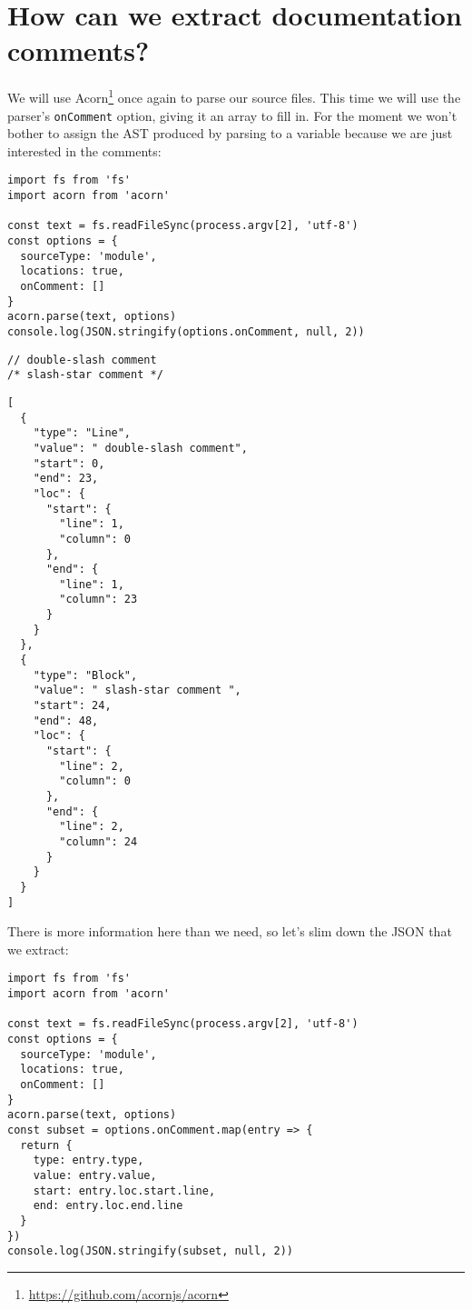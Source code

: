 \documentclass[krantzl]{krantz}
\newcommand{\hreffoot}[2]{{#1}\footnote{\href{#2}{#2}}}
\begin{document}
\section{How can we extract documentation comments?}\label{doc-generator-extract}


We will use \hreffoot{Acorn}{https://github.com/acornjs/acorn} once again to parse our source files.
This time we will use the parser's \texttt{onComment} option,
giving it an array to fill in.
For the moment we won't bother to assign the AST produced by parsing to a variable
because we are just interested in the comments:


\begin{lstlisting}[frame=single,frameround=tttt]
import fs from 'fs'
import acorn from 'acorn'

const text = fs.readFileSync(process.argv[2], 'utf-8')
const options = {
  sourceType: 'module',
  locations: true,
  onComment: []
}
acorn.parse(text, options)
console.log(JSON.stringify(options.onComment, null, 2))
\end{lstlisting}



\begin{lstlisting}[frame=single,frameround=tttt]
// double-slash comment
/* slash-star comment */
\end{lstlisting}



\begin{lstlisting}[frame=single,frameround=tttt]
[
  {
    "type": "Line",
    "value": " double-slash comment",
    "start": 0,
    "end": 23,
    "loc": {
      "start": {
        "line": 1,
        "column": 0
      },
      "end": {
        "line": 1,
        "column": 23
      }
    }
  },
  {
    "type": "Block",
    "value": " slash-star comment ",
    "start": 24,
    "end": 48,
    "loc": {
      "start": {
        "line": 2,
        "column": 0
      },
      "end": {
        "line": 2,
        "column": 24
      }
    }
  }
]
\end{lstlisting}



There is more information here than we need,
so let's slim down the JSON that we extract:


\begin{lstlisting}[frame=single,frameround=tttt]
import fs from 'fs'
import acorn from 'acorn'

const text = fs.readFileSync(process.argv[2], 'utf-8')
const options = {
  sourceType: 'module',
  locations: true,
  onComment: []
}
acorn.parse(text, options)
const subset = options.onComment.map(entry => {
  return {
    type: entry.type,
    value: entry.value,
    start: entry.loc.start.line,
    end: entry.loc.end.line
  }
})
console.log(JSON.stringify(subset, null, 2))
\end{lstlisting}
\end{document}
